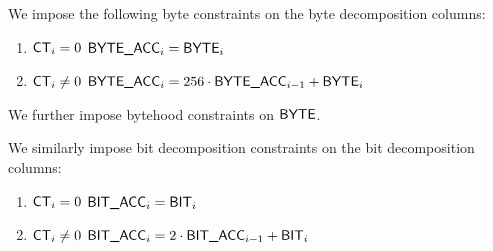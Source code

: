 We impose the following byte constraints on the byte decomposition columns:
\begin{enumerate}
	\item \If $\textsf{CT}_{i} =    0$ \Then $\textsf{BYTE}\textsf{\_}\textsf{ACC}_{i} = \textsf{BYTE}_{i}$
	\item \If $\textsf{CT}_{i} \neq 0$ \Then $\textsf{BYTE}\textsf{\_}\textsf{ACC}_{i} = 256 \cdot \textsf{BYTE}\textsf{\_}\textsf{ACC}_{i - 1} + \textsf{BYTE}_{i}$
\end{enumerate}
We further impose bytehood constraints on $\textsf{BYTE}$.

We similarly impose bit decomposition constraints on the bit decomposition columns:
\begin{enumerate}
	\item \If $\textsf{CT}_{i} =    0$ \Then $\textsf{BIT}\textsf{\_}\textsf{ACC}_{i} = \textsf{BIT}_{i}$
	\item \If $\textsf{CT}_{i} \neq 0$ \Then $\textsf{BIT}\textsf{\_}\textsf{ACC}_{i} = 2 \cdot \textsf{BIT}\textsf{\_}\textsf{ACC}_{i - 1} + \textsf{BIT}_{i}$
\end{enumerate}
